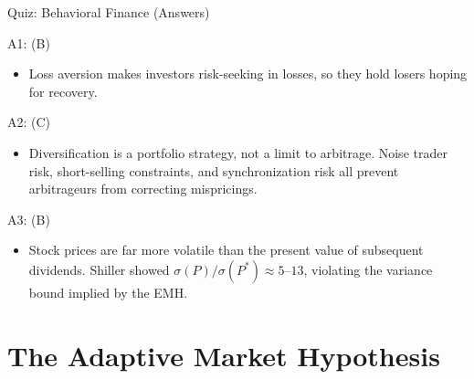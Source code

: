 \documentclass[9pt, aspectratio=169, t]{beamer}
\theoremstyle{definition}
\newenvironment{cminipage}[1]{%
    \par\noindent\hfill\begin{minipage}{#1}\ignorespaces
}{%
    \end{minipage}\hfill\null\par
}
\begin{document}
\begin{frame}{Quiz: Behavioral Finance (Answers)}
\begin{cminipage}{0.95\textwidth}
\small
\begin{exampleblock}{A1: (B)}
\begin{itemize}\setlength{\itemsep}{0pt}
    \item Loss aversion makes investors risk-seeking in losses, so they hold losers hoping for recovery.
\end{itemize}
\end{exampleblock}
\begin{exampleblock}{A2: (C)}
\begin{itemize}\setlength{\itemsep}{0pt}
    \item Diversification is a portfolio strategy, not a limit to arbitrage. Noise trader risk, short-selling constraints, and synchronization risk all prevent arbitrageurs from correcting mispricings.
\end{itemize}
\end{exampleblock}
\begin{exampleblock}{A3: (B)}
\begin{itemize}\setlength{\itemsep}{0pt}
    \item Stock prices are far more volatile than the present value of subsequent dividends. Shiller showed $\sigma(P)/\sigma(P^*) \approx 5$--$13$, violating the variance bound implied by the EMH.
\end{itemize}
\end{exampleblock}
\end{cminipage}
\end{frame}

\section{The Adaptive Market Hypothesis}
\end{document}
